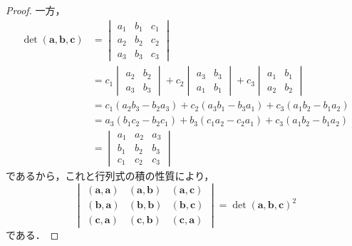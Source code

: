 \documentclass[a4paper,10pt,fleqn]{ltjsarticle}
\begin{document}
\begin{tleftbar}
\begin{proof}
        一方，
        \begin{align*}
            \det (\bm{a},\bm{b},\bm{c}) & =
            \begin{vmatrix}
                a_1 & b_1 & c_1 \\
                a_2 & b_2 & c_2 \\
                a_3 & b_3 & c_3
            \end{vmatrix}                                                                                        \\
                                        & = c_1
            \begin{vmatrix}
                a_2 & b_2 \\
                a_3 & b_3
            \end{vmatrix}
            + c_2
            \begin{vmatrix}
                a_3 & b_3 \\
                a_1 & b_1
            \end{vmatrix}
            + c_3
            \begin{vmatrix}
                a_1 & b_1 \\
                a_2 & b_2
            \end{vmatrix}
            \\
                                        & = c_1 (a_2 b_3-b_2 a_3)+c_2 (a_3 b_1 - b_3 a_1)+c_3 (a_1 b_2 -b_1 a_2)   \\
                                        & = a_3 (b_1 c_2 - b_2 c_1)+b_3 (c_1 a_2-c_2 a_1)+ c_3 (a_1 b_2 - b_1 a_2) \\
                                        & =
            \begin{vmatrix}
                a_1 & a_2 & a_3 \\
                b_1 & b_2 & b_3 \\
                c_1 & c_2 & c_3
            \end{vmatrix}
        \end{align*}
        であるから，これと行列式の積の性質により，
        \[
            \begin{vmatrix}
                (\bm{a},\bm{a}) & (\bm{a},\bm{b}) & (\bm{a},\bm{c}) \\
                (\bm{b},\bm{a}) & (\bm{b},\bm{b}) & (\bm{b},\bm{c}) \\
                (\bm{c},\bm{a}) & (\bm{c},\bm{b}) & (\bm{c},\bm{a})
            \end{vmatrix}
            = {\det (\bm{a},\bm{b},\bm{c})}^2
        \]
        である．
    \end{proof}
\end{tleftbar}
\end{document}
